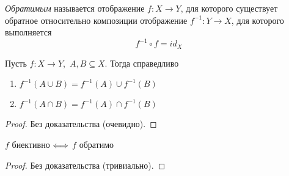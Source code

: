 \begin{definition}
    \textit{Обратимым} называется отображение $f \colon X \to Y$, для которого
    существует обратное относительно композиции отображение
    $f^{-1} \colon Y \to X$, для которого выполняется
\[
    f^{-1} \circ f = id_X
\]
\end{definition}

\begin{theorem}
    Пусть $f \colon X \to Y$, \,$A, B \subseteq X$. Тогда справедливо
    \begin{enumerate}
        \item $f^{-1}(A \cup B) = f^{-1}(A) \cup f^{-1}(B)$
        \item $f^{-1}(A \cap B) = f^{-1}(A) \cap f^{-1}(B)$
    \end{enumerate}
\end{theorem}
\begin{proof}
    Без доказательства (очевидно).
\end{proof}

\begin{theorem}
    $f$ биективно $\Longleftrightarrow$ $f$ обратимо
\end{theorem}
\begin{proof}
    Без доказательства (тривиально).
\end{proof}

\newpage


